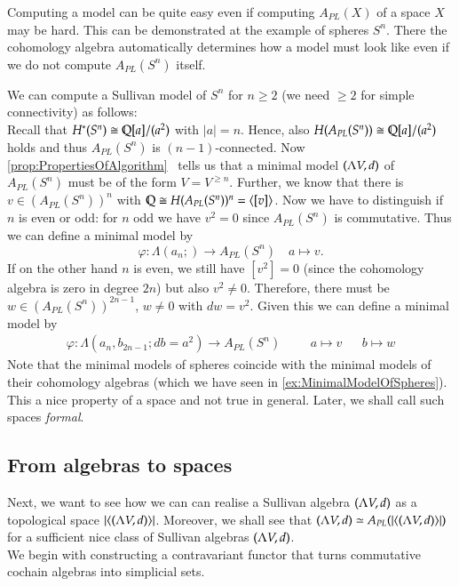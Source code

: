  Computing a model can be quite easy even if
 computing $A_{PL}(X)$ of a space $X$ may be  hard. This can be 
 demonstrated at the example of spheres $S^n$. There the cohomology algebra automatically determines how a model must look like
 even if we do not compute $A_{PL}(S^n)$ itself.
 \begin{Example}
 \label{ex:MinimalModelOfSpheresAPL}
  We can compute a Sullivan model of $S^n$ for $n \geq 2$ (we need $\geq 2$ for simple connectivity)
  as follows: \\ Recall that $H^*(S^n) \cong \mathbb{Q}[a]/(a^2)$ with $|a| = n$. Hence, also
  $H(A_{PL}(S^n)) \cong \mathbb{Q}[a]/(a^2)$ holds and thus $A_{PL}(S^n)$ is $(n-1)$-connected.
  Now \ref{prop:PropertiesOfAlgorithm}~ tells us that a minimal model $(\Lambda V,d)$ of $A_{PL}(S^n)$ must be 
  of the form $V = V^{\geq n}$. Further, we know that there is $v \in (A_{PL}(S^n))^n$ with 
  $\mathbb{Q} \cong H(A_{PL}(S^n))^n = \langle [v] \rangle$. Now we have to distinguish if $n$ is even or odd:
  for $n$ odd  we have $v^2 = 0$ since $A_{PL}(S^n)$ is commutative. Thus we can define
  a minimal model by 
  $$\varphi \colon \Lambda(a_n;) \to A_{PL}(S^n) \quad  a \mapsto v.$$
  If on the other hand $n$ is even, we still have $[v^2] = 0$ (since the cohomology algebra is zero in degree $2n$)
  but also $v^2 \neq 0$. Therefore, there must be $w \in (A_{PL}(S^n))^{2n-1}$, $w \neq 0$ with $dw = v^2$. Given this we can define
  a minimal model by
  \begin{align*}
  \varphi \colon \Lambda(a_n, b_{2n-1} ; db = a^2) \to A_{PL}(S^n)& &  &a \mapsto v 
   & &b \mapsto w
  \end{align*}
  Note that the minimal models of spheres coincide with the minimal models of their cohomology algebras 
  (which we have seen in \ref{ex:MinimalModelOfSpheres}). This a  nice property of a space 
  and not true in general. Later, we shall call such spaces \emph{formal}.
 \end{Example}

 
 
 \subsection{From algebras to spaces}
 
 Next, we want to see how we can can realise a Sullivan algebra $(\Lambda V,d)$ as a topological space 
 $| \langle (\Lambda V,d) \rangle |$. Moreover, we shall see that $(\Lambda V,d) \simeq A_{PL}(| \langle (\Lambda V,d) \rangle |)$ for a
 sufficient nice class of Sullivan algebras $(\Lambda V,d)$. \\
 We begin with constructing a contravariant functor that turns commutative cochain algebras into simplicial sets.
 
